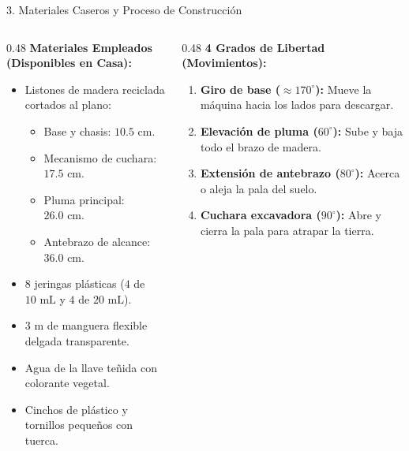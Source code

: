 \documentclass[
  spanish,
  aspectratio=169,
  xcolor={dvipsnames,table}
]{beamer}
\begin{document}
\begin{frame}{3. Materiales Caseros y Proceso de Construcción}
  \begin{columns}[T]
    \begin{column}{0.48\textwidth}
      \textbf{\color{uanlblue}Materiales Empleados (Disponibles en Casa):}
      \begin{itemize}
        \item Listones de madera reciclada cortados al plano:
          \begin{itemize}
            \item Base y chasis: $10.5\text{ cm}$.
            \item Mecanismo de cuchara: $17.5\text{ cm}$.
            \item Pluma principal: $26.0\text{ cm}$.
            \item Antebrazo de alcance: $36.0\text{ cm}$.
          \end{itemize}
        \item 8 jeringas plásticas ($4$ de $10\text{ mL}$ y $4$ de $20\text{ mL}$).
        \item $3\text{ m}$ de manguera flexible delgada transparente.
        \item Agua de la llave teñida con colorante vegetal.
        \item Cinchos de plástico y tornillos pequeños con tuerca.
      \end{itemize}
    \end{column}
    \begin{column}{0.48\textwidth}
      \textbf{\color{uanlblue}4 Grados de Libertad (Movimientos):}
      \begin{enumerate}
        \item \textbf{Giro de base ($\approx 170^\circ$):} Mueve la máquina hacia los lados para descargar.
        \item \textbf{Elevación de pluma ($60^\circ$):} Sube y baja todo el brazo de madera.
        \item \textbf{Extensión de antebrazo ($80^\circ$):} Acerca o aleja la pala del suelo.
        \item \textbf{Cuchara excavadora ($90^\circ$):} Abre y cierra la pala para atrapar la tierra.
      \end{enumerate}
    \end{column}
  \end{columns}
\end{frame}
\end{document}
